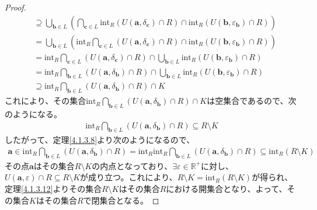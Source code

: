 \documentclass[dvipdfmx]{jsarticle}
\begin{document}
\begin{proof}
\begin{align*}
&\supseteq \bigcup_{\mathbf{b} \in L} \left( \bigcap_{\mathbf{c} \in L} {\mathrm{int}_{R}\left( U\left( \mathbf{a},\delta_{\mathbf{c}} \right) \cap R \right)} \cap \mathrm{int}_{R}\left( U\left( \mathbf{b},\varepsilon_{\mathbf{b}} \right) \cap R \right) \right)\\
&= \bigcup_{\mathbf{b} \in L} \left( \mathrm{int}_{R}{\bigcap_{\mathbf{c} \in L} \left( U\left( \mathbf{a},\delta_{\mathbf{c}} \right) \cap R \right)} \cap \mathrm{int}_{R}\left( U\left( \mathbf{b},\varepsilon_{\mathbf{b}} \right) \cap R \right) \right)\\
&= \mathrm{int}_{R}{\bigcap_{\mathbf{c} \in L} \left( U\left( \mathbf{a},\delta_{\mathbf{c}} \right) \cap R \right)} \cap \bigcup_{\mathbf{b} \in L} {\mathrm{int}_{R}\left( U\left( \mathbf{b},\varepsilon_{\mathbf{b}} \right) \cap R \right)}\\
&= \mathrm{int}_{R}{\bigcap_{\mathbf{b} \in L} \left( U\left( \mathbf{a},\delta_{\mathbf{b}} \right) \cap R \right)} \cap \bigcup_{\mathbf{b} \in L} {\mathrm{int}_{R}\left( U\left( \mathbf{b},\varepsilon_{\mathbf{b}} \right) \cap R \right)}\\
&\supseteq \mathrm{int}_{R}{\bigcap_{\mathbf{b} \in L} \left( U\left( \mathbf{a},\delta_{\mathbf{b}} \right) \cap R \right)} \cap K
\end{align*}
これにより、その集合$\mathrm{int}_{R}{\bigcap_{\mathbf{b} \in L} \left( U\left( \mathbf{a},\delta_{\mathbf{b}} \right) \cap R \right)} \cap K$は空集合であるので、次のようになる。
\begin{align*}
\mathrm{int}_{R}{\bigcap_{\mathbf{b} \in L} \left( U\left( \mathbf{a},\delta_{\mathbf{b}} \right) \cap R \right)} \subseteq R \setminus K
\end{align*}
したがって、定理\ref{4.1.3.8}より次のようになるので、
\begin{align*}
\mathbf{a} \in \mathrm{int}_{R}{\bigcap_{\mathbf{b} \in L} \left( U\left( \mathbf{a},\delta_{\mathbf{b}} \right) \cap R \right)} = \mathrm{int}_{R}{\mathrm{int}_{R}{\bigcap_{\mathbf{b} \in L} \left( U\left( \mathbf{a},\delta_{\mathbf{b}} \right) \cap R \right)}} \subseteq \mathrm{int}_{R}(R \setminus K)
\end{align*}
その点$\mathbf{a}$はその集合$R \setminus K$の内点となっており、$\exists\varepsilon \in \mathbb{R}^{+}$に対し、$U\left( \mathbf{a},\varepsilon \right) \cap R \subseteq R \setminus K$が成り立つ。これにより、$R \setminus K = \mathrm{int}_{R}(R \setminus K)$が得られ、定理\ref{4.1.3.12}よりその集合$R \setminus K$はその集合$R$における開集合となり、よって、その集合$K$はその集合$R$で閉集合となる。
\end{proof}
\end{document}
